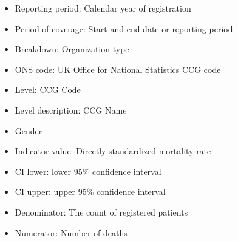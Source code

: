 \begin{itemize}
    \item Reporting period: Calendar year of registration
    \item Period of coverage: Start and end date or reporting period
    \item Breakdown: Organization type
    \item ONS code: UK Office for National Statistics CCG code
    \item Level: CCG Code
    \item Level description: CCG Name
    \item Gender
    \item Indicator value: Directly standardized mortality rate
    \item CI lower: lower 95\% confidence interval
    \item CI upper: upper 95\% confidence interval
    \item Denominator: The count of registered patients
    \item Numerator: Number of deaths
\end{itemize}